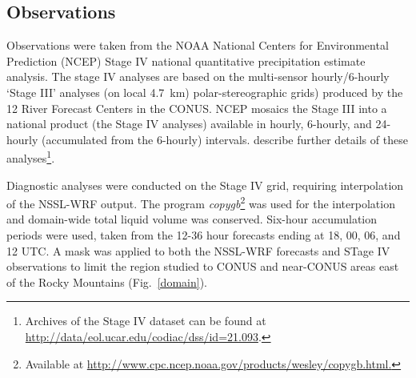 \subsection{Observations}
\label{observations}

Observations were taken from the NOAA National Centers for Environmental Prediction (NCEP) Stage IV national quantitative precipitation estimate analysis. The stage IV analyses are based on the multi-sensor hourly/6-hourly `Stage III' analyses (on local \mbox{4.7 km}) polar-stereographic grids) produced by the 12 River Forecast Centers in the CONUS. NCEP mosaics the Stage III into a national product (the Stage IV analyses) available in hourly, 6-hourly, and 24-hourly (accumulated from the 6-hourly) intervals. \cite{StageIV} describe further details of these analyses\footnote{Archives of the Stage IV dataset can be found at \url{http://data/eol.ucar.edu/codiac/dss/id=21.093}.}.

Diagnostic analyses were conducted on the Stage IV grid, requiring interpolation of the NSSL-WRF output. The program \emph{copygb}\footnote{Available at \url{http://www.cpc.ncep.noaa.gov/products/wesley/copygb.html.}} was used for the interpolation and domain-wide total liquid volume was conserved. Six-hour accumulation periods were used, taken from the 12-36 hour forecasts ending at 18, 00, 06, and 12 UTC. A mask was applied to both the NSSL-WRF forecasts and STage IV observations to limit the region studied to CONUS and near-CONUS areas east of the Rocky Mountains \mbox{(Fig. \ref{domain})}.



